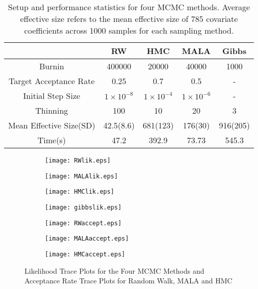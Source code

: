 \documentclass[12pt]{article}
\begin{document}
\begin{table}[htbp]
	\centering
	\begin{tabular}{ccccc}
		\toprule
		& RW & HMC & MALA & Gibbs\\
		\midrule
		Burnin & 400000 & 20000 & 40000 & 1000\\
		Target Acceptance Rate & 0.25 & 0.7 & 0.5 & -\\
		Initial Step Size & $1\times 10^{-8}$ & $1\times 10^{-4}$ & $1\times 10^{-6}$ & -\\
		Thinning & 100 & 10 & 20 & 3\\
		\midrule
		Mean Effective Size(SD) & 42.5(8.6) & 681(123) & 176(30) & 916(205)\\
		Time(s) & 47.2 & 392.9 & 73.73 & 545.3\\
		\bottomrule  
	\end{tabular}
	\caption{Setup and performance statistics for four MCMC methods. Average effective size refers to the mean effective size of 785 covariate coefficients across 1000 samples for each sampling method.}\label{MCMCsetup}
\end{table}

\begin{figure}[htbp]
	\begin{subfigure}[b]{0.32\columnwidth}
		\texttt{[image: RWlik.eps]}
	\end{subfigure}
	\hfill
	\begin{subfigure}[b]{0.32\columnwidth}
		\texttt{[image: MALAlik.eps]}
	\end{subfigure}
	\hfill
	\begin{subfigure}[b]{0.32\columnwidth}
		\texttt{[image: HMClik.eps]}
	\end{subfigure}

	\begin{subfigure}[b]{0.32\columnwidth}
		\texttt{[image: gibbslik.eps]}
	\end{subfigure}
	\hfill
	\begin{subfigure}[b]{0.32\columnwidth}
		\texttt{[image: RWaccept.eps]}
	\end{subfigure}
	\hfill
	\begin{subfigure}[b]{0.32\columnwidth}
		\texttt{[image: MALAaccept.eps]}
	\end{subfigure}
	\begin{subfigure}[b]{0.32\columnwidth}
		\texttt{[image: HMCaccept.eps]}
	\end{subfigure}
	
	\caption{Likelihood Trace Plots for the Four MCMC Methods and Acceptance Rate Trace Plots for Random Walk, MALA and HMC }\label{likandacceptance}
\end{figure}
\end{document}
